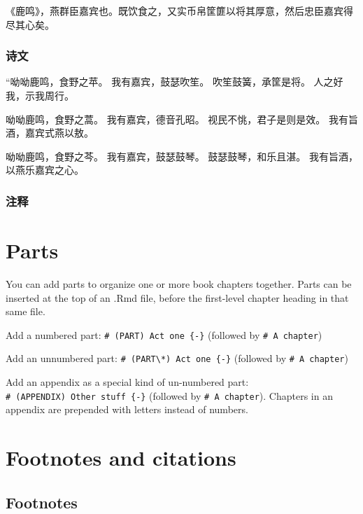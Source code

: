 \documentclass[
]{book}
\theoremstyle{definition}
\theoremstyle{definition}
\theoremstyle{definition}
\theoremstyle{definition}
\theoremstyle{remark}
\begin{document}
《鹿鸣》，燕群臣嘉宾也。既饮食之，又实币帛筐篚以将其厚意，然后忠臣嘉宾得尽其心矣。

\hypertarget{ux8bd7ux6587-2}{%
\subsection*{诗文}\label{ux8bd7ux6587-2}}

``呦呦鹿鸣，食野之苹。
我有嘉宾，鼓瑟吹笙。
吹笙鼓簧，承筐是将。
人之好我，示我周行。

呦呦鹿鸣，食野之蒿。
我有嘉宾，德音孔昭。
视民不恌，君子是则是效。
我有旨酒，嘉宾式燕以敖。

呦呦鹿鸣，食野之芩。
我有嘉宾，鼓瑟鼓琴。
鼓瑟鼓琴，和乐且湛。
我有旨酒，以燕乐嘉宾之心。

\hypertarget{ux6ce8ux91ca-2}{%
\subsection{注释}\label{ux6ce8ux91ca-2}}

\hypertarget{parts}{%
\chapter{Parts}\label{parts}}

You can add parts to organize one or more book chapters together. Parts can be inserted at the top of an .Rmd file, before the first-level chapter heading in that same file.

Add a numbered part: \texttt{\#\ (PART)\ Act\ one\ \{-\}} (followed by \texttt{\#\ A\ chapter})

Add an unnumbered part: \texttt{\#\ (PART\textbackslash{}*)\ Act\ one\ \{-\}} (followed by \texttt{\#\ A\ chapter})

Add an appendix as a special kind of un-numbered part: \texttt{\#\ (APPENDIX)\ Other\ stuff\ \{-\}} (followed by \texttt{\#\ A\ chapter}). Chapters in an appendix are prepended with letters instead of numbers.

\hypertarget{footnotes-and-citations}{%
\chapter{Footnotes and citations}\label{footnotes-and-citations}}

\hypertarget{footnotes}{%
\section{Footnotes}\label{footnotes}}
\end{document}
